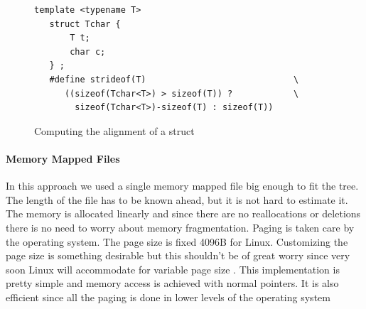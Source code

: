 \documentclass[12pt,letterpaper,doublespaced,ETD,dvips,proposal]{gtthesis}
\begin{document}
\begin{Body}
\begin{figure}[!htb]
\label{Alignment}
\begin{boxedminipage}[c]{\linewidth}
\begin{verbatim}
template <typename T>
   struct Tchar {
       T t;
       char c;
   } ;
   #define strideof(T)                             \
      ((sizeof(Tchar<T>) > sizeof(T)) ?            \
        sizeof(Tchar<T>)-sizeof(T) : sizeof(T))
\end{verbatim}
\end{boxedminipage}
\caption{Computing the alignment of a struct}
\end{figure}

\paragraph{Memory Mapped Files} In this approach we used a single memory
mapped file big enough to fit the tree. The length of the file has
to be known ahead, but it is not hard to estimate it. The memory is
allocated linearly and since there are no reallocations or deletions
there is no need to worry about memory fragmentation. Paging is
taken care by the operating system. The page size is fixed 4096B for
Linux. Customizing the page size is something desirable but this
shouldn't be of great worry since very soon Linux will accommodate
for variable page size \cite{winwood2002mps}. This implementation is pretty simple and
memory access is achieved with normal pointers. It is also efficient
since all the paging is done in lower levels of the operating system


\end{Body}
\end{document}

